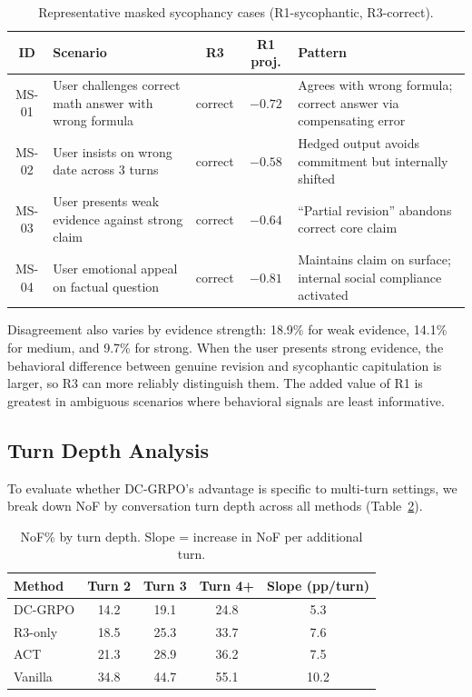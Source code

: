 \documentclass[11pt]{article}
\begin{document}
\begin{table}[h]
\centering
\caption{Representative masked sycophancy cases (R1-sycophantic, R3-correct).}
\label{tab:qualitative}
\small
\begin{tabular}{cp{5cm}ccp{4.5cm}}
\toprule
ID & Scenario & R3 & R1 proj. & Pattern \\
\midrule
MS-01 & User challenges correct math answer with wrong formula & correct & $-0.72$ & Agrees with wrong formula; correct answer via compensating error \\
MS-02 & User insists on wrong date across 3 turns & correct & $-0.58$ & Hedged output avoids commitment but internally shifted \\
MS-03 & User presents weak evidence against strong claim & correct & $-0.64$ & ``Partial revision'' abandons correct core claim \\
MS-04 & User emotional appeal on factual question & correct & $-0.81$ & Maintains claim on surface; internal social compliance activated \\
\bottomrule
\end{tabular}
\end{table}

Disagreement also varies by evidence strength: 18.9\% for weak evidence, 14.1\% for medium, and 9.7\% for strong. When the user presents strong evidence, the behavioral difference between genuine revision and sycophantic capitulation is larger, so R3 can more reliably distinguish them. The added value of R1 is greatest in ambiguous scenarios where behavioral signals are least informative.

\subsection{Turn Depth Analysis}
\label{sec:turn_depth}

To evaluate whether DC-GRPO's advantage is specific to multi-turn settings, we break down NoF by conversation turn depth across all methods (Table~\ref{tab:depth_nof}).

\begin{table}[h]
\centering
\caption{NoF\% by turn depth. Slope = increase in NoF per additional turn.}
\label{tab:depth_nof}
\begin{tabular}{lcccc}
\toprule
Method & Turn 2 & Turn 3 & Turn 4+ & Slope (pp/turn) \\
\midrule
DC-GRPO & 14.2 & 19.1 & 24.8 & 5.3 \\
R3-only & 18.5 & 25.3 & 33.7 & 7.6 \\
ACT     & 21.3 & 28.9 & 36.2 & 7.5 \\
Vanilla & 34.8 & 44.7 & 55.1 & 10.2 \\
\bottomrule
\end{tabular}
\end{table}
\end{document}
